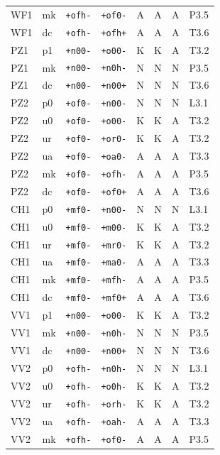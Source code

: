 {\begin{longtable}{@{}llllcccl@{}}
WF1 & mk & \texttt{+ofh-} & \texttt{+of0-} & A & A & A & P3.5 \\
WF1 & dc & \texttt{+ofh-} & \texttt{+ofh+} & A & A & A & T3.6 \\
PZ1 & p1 & \texttt{+n00-} & \texttt{+o00-} & K & K & A & T3.2 \\
PZ1 & mk & \texttt{+n00-} & \texttt{+n0h-} & N & N & N & P3.5 \\
PZ1 & dc & \texttt{+n00-} & \texttt{+n00+} & N & N & N & T3.6 \\
PZ2 & p0 & \texttt{+of0-} & \texttt{+n00-} & N & N & N & L3.1 \\
PZ2 & u0 & \texttt{+of0-} & \texttt{+o00-} & K & K & A & T3.2 \\
PZ2 & ur & \texttt{+of0-} & \texttt{+or0-} & K & K & A & T3.2 \\
PZ2 & ua & \texttt{+of0-} & \texttt{+oa0-} & A & A & A & T3.3 \\
PZ2 & mk & \texttt{+of0-} & \texttt{+ofh-} & A & A & A & P3.5 \\
PZ2 & dc & \texttt{+of0-} & \texttt{+of0+} & A & A & A & T3.6 \\
CH1 & p0 & \texttt{+mf0-} & \texttt{+n00-} & N & N & N & L3.1 \\
CH1 & u0 & \texttt{+mf0-} & \texttt{+m00-} & K & K & A & T3.2 \\
CH1 & ur & \texttt{+mf0-} & \texttt{+mr0-} & K & K & A & T3.2 \\
CH1 & ua & \texttt{+mf0-} & \texttt{+ma0-} & A & A & A & T3.3 \\
CH1 & mk & \texttt{+mf0-} & \texttt{+mfh-} & A & A & A & P3.5 \\
CH1 & dc & \texttt{+mf0-} & \texttt{+mf0+} & A & A & A & T3.6 \\
VV1 & p1 & \texttt{+n00-} & \texttt{+o00-} & K & K & A & T3.2 \\
VV1 & mk & \texttt{+n00-} & \texttt{+n0h-} & N & N & N & P3.5 \\
VV1 & dc & \texttt{+n00-} & \texttt{+n00+} & N & N & N & T3.6 \\
VV2 & p0 & \texttt{+ofh-} & \texttt{+n0h-} & N & N & N & L3.1 \\
VV2 & u0 & \texttt{+ofh-} & \texttt{+o0h-} & K & K & A & T3.2 \\
VV2 & ur & \texttt{+ofh-} & \texttt{+orh-} & K & K & A & T3.2 \\
VV2 & ua & \texttt{+ofh-} & \texttt{+oah-} & A & A & A & T3.3 \\
VV2 & mk & \texttt{+ofh-} & \texttt{+of0-} & A & A & A & P3.5 \\

\end{longtable}}

